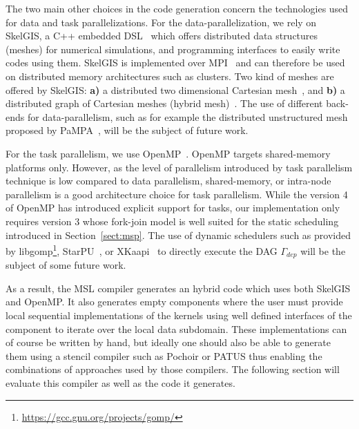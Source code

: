 The two main other choices in the code generation concern the technologies used for data and task parallelizations.
For the data-parallelization, we rely on SkelGIS, a C++ embedded DSL~\cite{CPE:CPE3494} which offers distributed data structures (meshes) for numerical simulations, and programming interfaces to easily write codes using them.
SkelGIS is implemented over MPI~\cite{Graham2009MSE} and can therefore be used on distributed memory architectures such as clusters.
Two kind of meshes are offered by SkelGIS: \textbf{a)} a distributed two dimensional Cartesian mesh~\cite{DBLP:conf/ieeehpcs/HeleneS13}, and \textbf{b)} a distributed graph of Cartesian meshes (hybrid mesh)~\cite{DBLP:conf/europar/CoullonL14}.
The use of different back-ends for data-parallelism, such as for example the distributed unstructured mesh proposed by PaMPA~\cite{lachat:hal-00768916}, will be the subject of future work.

For the task parallelism, we use OpenMP~\cite{660313}.
OpenMP targets shared-memory platforms only. However, as the level of parallelism introduced by task parallelism technique is low compared to data parallelism, shared-memory, or intra-node parallelism is a good architecture choice for task parallelism.%
While the version 4 of OpenMP has introduced explicit support for tasks, our implementation only requires version 3 whose fork-join model is well suited for the static scheduling introduced in Section~\ref{sect:msp}.
The use of dynamic schedulers such as provided by libgomp\footnote{\url{https://gcc.gnu.org/projects/gomp/}}, StarPU~\cite{Augonnet2011}, or XKaapi~\cite{Gautier:2013:XRS:2510661.2511383} to directly execute the DAG $\Gamma_{dep}$ will be the subject of some future work.

As a result, the MSL compiler generates an hybrid code which uses both SkelGIS and OpenMP.
It also generates empty components where the user must provide local sequential implementations of the kernels using well defined interfaces of the component to iterate over the local data subdomain.
These implementations can of course be written by hand, but ideally one should also be able to generate them using a stencil compiler such as Pochoir or PATUS thus enabling the combinations of approaches used by those compilers.
The following section will evaluate this compiler as well as the code it generates.
